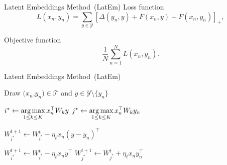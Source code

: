 \documentclass[mathserif, xcolor=table]{beamer}
\def\D{\Delta}
\def\T{\mathcal{T}}
\def\Y{\mathcal{Y}}
\def\argmax{\mathop{\rm arg\,max}\limits}%
\def\Y{\mathcal{Y}}
\begin{document}
\begin{frame}{Latent Embeddings Method~(LatEm)}
Loss function
\begin{equation*}
    L(x_n,y_n) = \sum_{y \in \Y} \left[\D(y_n,y) + F(x_n,y) -F(x_n,y_n)\right]_+,
\end{equation*}
\pause

Objective function
\begin{equation*}
\frac{1}{N} \sum_{n=1}^{N} L(x_n, y_n).
\end{equation*}

\end{frame}

\begin{frame}{Latent Embeddings Method~(LatEm)}
\begin{algorithm}[H]
\small
\begin{algorithmic}[1]
\small
	\FORALL {$n=1$ to $|\T|$} 
      		\STATE  Draw $(x_n$,$y_n) \in \T$ and $y \in \Y \setminus \{y_n\}$ 
      		\pause

      			\pause

				\STATE $i^* \leftarrow \argmax\limits_{1\leq k\leq K} x_n^\top W_k y$
				\STATE $j^* \leftarrow \argmax\limits_{1\leq k\leq K} x_n^\top W_k y_n $  
				      			\pause

				\STATE $W_{i^*}^{t+1} \leftarrow W_{i^*}^{t} - \eta_t x_n (y - y_n)^\top$
				\ENDIF
				      			\pause

          			\STATE $W_{i^*}^{t+1} \leftarrow W_{i^*}^{t} - \eta_t x_n y^\top$ 
          			\STATE $W_{j^*}^{t+1} \leftarrow W_{j^*}^{t} + \eta_t x_n y_n^\top$ 
          			\ENDIF
        		\ENDIF
      \ENDFOR
    \ENDFOR
\end{algorithmic}
\caption*{Algorithm: SGD optimization of LatEm }
\label{alg:seq}
\end{algorithm}


\end{frame}
\end{document}
